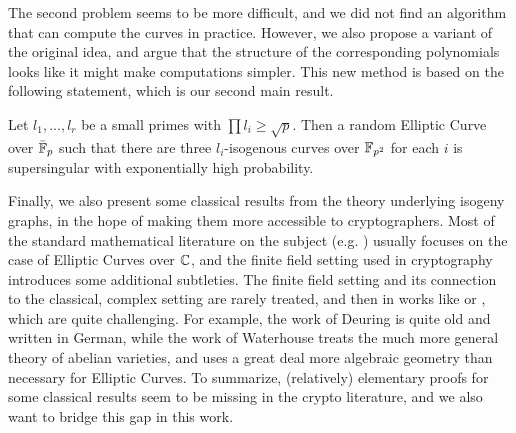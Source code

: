 The second problem seems to be more difficult, and we did not find an algorithm that can compute the curves in practice.
However, we also propose a variant of the original idea, and argue that the structure of the corresponding polynomials looks like it might make computations simpler.
This new method is based on the following statement, which is our second main result.
\begin{prop}
    \label{prop:main_result2}
    Let $l_1, ..., l_r$ be a small primes with $\prod l_i \geq \sqrt{p}$.
    Then a random Elliptic Curve over $\bar{\mathbb{F}}_p$ such that there are three $l_i$-isogenous curves over $\mathbb{F}_{p^2}$ for each $i$ is supersingular with exponentially high probability.
\end{prop}
Finally, we also present some classical results from the theory underlying isogeny graphs, in the hope of making them more accessible to cryptographers.
Most of the standard mathematical literature on the subject (e.g. \cite{cox_primes_of_form}) usually focuses on the case of Elliptic Curves over $\mathbb{C}$, and the finite field setting used in cryptography introduces some additional subtleties.
The finite field setting and its connection to the classical, complex setting are rarely treated, and then in works like \cite{deuring_endomorphism_rings} or \cite{class_group_action_waterhouse}, which are quite challenging.
For example, the work of Deuring \cite{deuring_endomorphism_rings} is quite old and written in German, while the work of Waterhouse \cite{class_group_action_waterhouse} treats the much more general theory of abelian varieties, and uses a great deal more algebraic geometry than necessary for Elliptic Curves. 
To summarize, (relatively) elementary proofs for some classical results seem to be missing in the crypto literature, and we also want to bridge this gap in this work.
